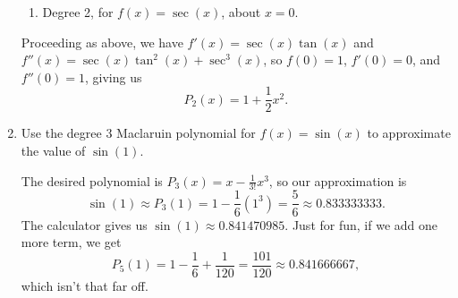 \documentclass[12pt]{article}
\begin{document}
\begin{enumerate}
\begin{enumerate}
\item Degree 2, for $f(x)=\sec(x)$, about $x=0$.
\end{enumerate}

Proceeding as above, we have $f'(x)=\sec(x)\tan(x)$ and $f''(x)=\sec(x)\tan^2(x)+\sec^3(x)$, so $f(0)=1$, $f'(0)=0$, and $f''(0)=1$, giving us
\[
P_2(x) = 1+\frac12 x^2.
\]

\item Use the degree 3 Maclaruin polynomial for $f(x)=\sin(x)$ to approximate the value of $\sin(1)$.

The desired polynomial is $P_3(x) = x-\frac{1}{3!}x^3$, so our approximation is
\[
\sin(1)\approx P_3(1)=1-\frac{1}{6}(1^3) = \frac56 \approx 0.833333333.
\]
The calculator gives us $\sin(1) \approx 0.841470985$. Just for fun, if we add one more term, we get
\[
P_5(1) = 1-\frac16+\frac{1}{120} = \frac{101}{120} \approx 0.841666667,
\]
which isn't that far off.
\end{enumerate}
\end{document}
